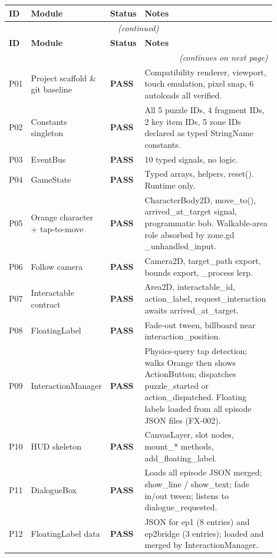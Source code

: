 \documentclass[12pt, a4paper]{article}
\newcommand{\statuspass}{\textcolor{passgre}{\textbf{PASS}}}
\begin{document}
\begin{longtable}{p{0.06\linewidth} p{0.25\linewidth} p{0.09\linewidth} p{0.50\linewidth}}
\toprule
\textbf{ID} & \textbf{Module} & \textbf{Status} & \textbf{Notes} \\
\midrule
\endfirsthead
\multicolumn{4}{c}{\small\textit{(continued)}} \\
\toprule
\textbf{ID} & \textbf{Module} & \textbf{Status} & \textbf{Notes} \\
\midrule
\endhead
\midrule
\multicolumn{4}{r}{\small\textit{(continues on next page)}} \\
\endfoot
\bottomrule
\endlastfoot

P01 & Project scaffold \& git baseline & \statuspass & Compatibility renderer, viewport, touch emulation, pixel snap, 6 autoloads all verified. \\
P02 & Constants singleton & \statuspass & All 5 puzzle IDs, 4 fragment IDs, 2 key item IDs, 5 zone IDs declared as typed StringName constants. \\
P03 & EventBus & \statuspass & 10 typed signals, no logic. \\
P04 & GameState & \statuspass & Typed arrays, helpers, reset(). Runtime only. \\
P05 & Orange character + tap-to-move & \statuspass & CharacterBody2D, move\_to(), arrived\_at\_target signal, programmatic bob. Walkable-area role absorbed by zone.gd \_unhandled\_input. \\
P06 & Follow camera & \statuspass & Camera2D, target\_path export, bounds export, \_process lerp. \\
P07 & Interactable contract & \statuspass & Area2D, interactable\_id, action\_label, request\_interaction awaits arrived\_at\_target. \\
P08 & FloatingLabel & \statuspass & Fade-out tween, billboard near interaction\_position. \\
P09 & InteractionManager & \statuspass & Physics-query tap detection; walks Orange then shows ActionButton; dispatches puzzle\_started or action\_dispatched. Floating labels loaded from all episode JSON files (FX-002). \\
P10 & HUD skeleton & \statuspass & CanvasLayer, slot nodes, mount\_* methods, add\_floating\_label. \\
P11 & DialogueBox & \statuspass & Loads all episode JSON merged; show\_line / show\_text; fade in/out tween; listens to dialogue\_requested. \\
P12 & FloatingLabel data & \statuspass & JSON for ep1 (8 entries) and ep2bridge (3 entries); loaded and merged by InteractionManager. \\

\end{longtable}
\end{document}
